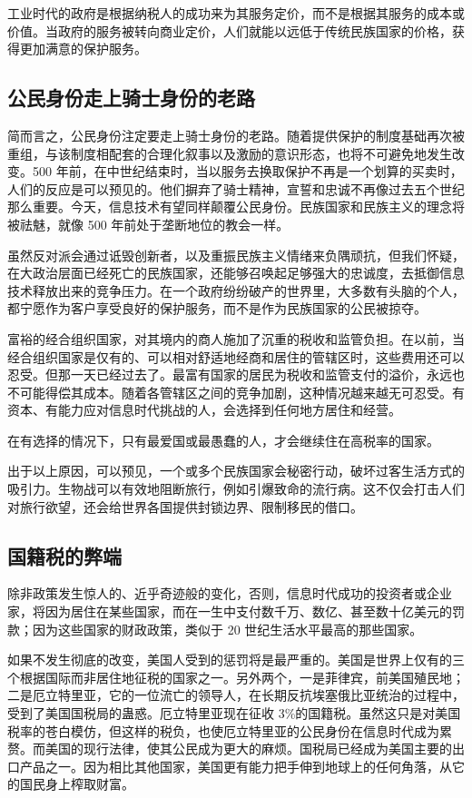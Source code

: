工业时代的政府是根据纳税人的成功来为其服务定价，而不是根据其服务的成本或价值。当政府的服务被转向商业定价，人们就能以远低于传统民族国家的价格，获得更加满意的保护服务。

\subsection{公民身份走上骑士身份的老路}
简而言之，公民身份注定要走上骑士身份的老路。随着提供保护的制度基础再次被重组，与该制度相配套的合理化叙事以及激励的意识形态，也将不可避免地发生改变。500 年前，在中世纪结束时，当以服务去换取保护不再是一个划算的买卖时，人们的反应是可以预见的。他们摒弃了骑士精神，宣誓和忠诚不再像过去五个世纪那么重要。今天，信息技术有望同样颠覆公民身份。民族国家和民族主义的理念将被祛魅，就像 500 年前处于垄断地位的教会一样。

虽然反对派会通过诋毁创新者，以及重振民族主义情绪来负隅顽抗，但我们怀疑，在大政治层面已经死亡的民族国家，还能够召唤起足够强大的忠诚度，去抵御信息技术释放出来的竞争压力。在一个政府纷纷破产的世界里，大多数有头脑的个人，都宁愿作为客户享受良好的保护服务，而不是作为民族国家的公民被掠夺。

富裕的经合组织国家，对其境内的商人施加了沉重的税收和监管负担。在以前，当经合组织国家是仅有的、可以相对舒适地经商和居住的管辖区时，这些费用还可以忍受。但那一天已经过去了。最富有国家的居民为税收和监管支付的溢价，永远也不可能得偿其成本。随着各管辖区之间的竞争加剧，这种情况越来越无可忍受。有资本、有能力应对信息时代挑战的人，会选择到任何地方居住和经营。

在有选择的情况下，只有最爱国或最愚蠢的人，才会继续住在高税率的国家。

出于以上原因，可以预见，一个或多个民族国家会秘密行动，破坏过客生活方式的吸引力。生物战可以有效地阻断旅行，例如引爆致命的流行病。这不仅会打击人们对旅行欲望，还会给世界各国提供封锁边界、限制移民的借口。

\subsection{国籍税的弊端}
除非政策发生惊人的、近乎奇迹般的变化，否则，信息时代成功的投资者或企业家，将因为居住在某些国家，而在一生中支付数千万、数亿、甚至数十亿美元的罚款；因为这些国家的财政政策，类似于 20 世纪生活水平最高的那些国家。

如果不发生彻底的改变，美国人受到的惩罚将是最严重的。美国是世界上仅有的三个根据国际而非居住地征税的国家之一。另外两个，一是菲律宾，前美国殖民地；二是厄立特里亚，它的一位流亡的领导人，在长期反抗埃塞俄比亚统治的过程中，受到了美国国税局的蛊惑。厄立特里亚现在征收 3\%的国籍税。虽然这只是对美国税率的苍白模仿，但这样的税负，也使厄立特里亚的公民身份在信息时代成为累赘。而美国的现行法律，使其公民成为更大的麻烦。国税局已经成为美国主要的出口产品之一。因为相比其他国家，美国更有能力把手伸到地球上的任何角落，从它的国民身上榨取财富。

